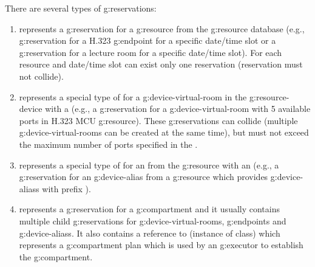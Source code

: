 There are several types of \glspl{g:reservation}:
\begin{enumerate}
\item {} represents a \gls{g:reservation} for a \gls{g:resource} from the \gls{g:resource} database (e.g., \gls{g:reservation} for a H.323 \gls{g:endpoint} for a specific date/time slot or a \gls{g:reservation} for a lecture room for a specific date/time slot). For each resource and date/time slot can exist only one reservation (reservation must not collide).
\item {} represents a special type of  for a \gls{g:device-virtual-room} in the \gls{g:resource-device} with a  (e.g., a \gls{g:reservation} for a \gls{g:device-virtual-room} with 5 available ports in H.323 MCU \gls{g:resource}). These \glspl{g:reservation} can collide (multiple \glspl{g:device-virtual-room} can be created at the same time), but must not exceed the maximum number of ports specified in the .
\item {} represents a special type of  for an  from the \gls{g:resource} with an  (e.g., a \gls{g:reservation} for an \gls{g:device-alias}  from a \gls{g:resource} which provides \glspl{g:device-alias} with prefix ).
\item {} represents a \gls{g:reservation} for a \gls{g:compartment} and it usually contains multiple child \glspl{g:reservation} for \glspl{g:device-virtual-room}, \glspl{g:endpoint} and \glspl{g:device-alias}. It also contains a reference to  (instance of  class) which represents a \gls{g:compartment} plan which is used by an \gls{g:executor} to establish the \gls{g:compartment}.
\end{enumerate}


